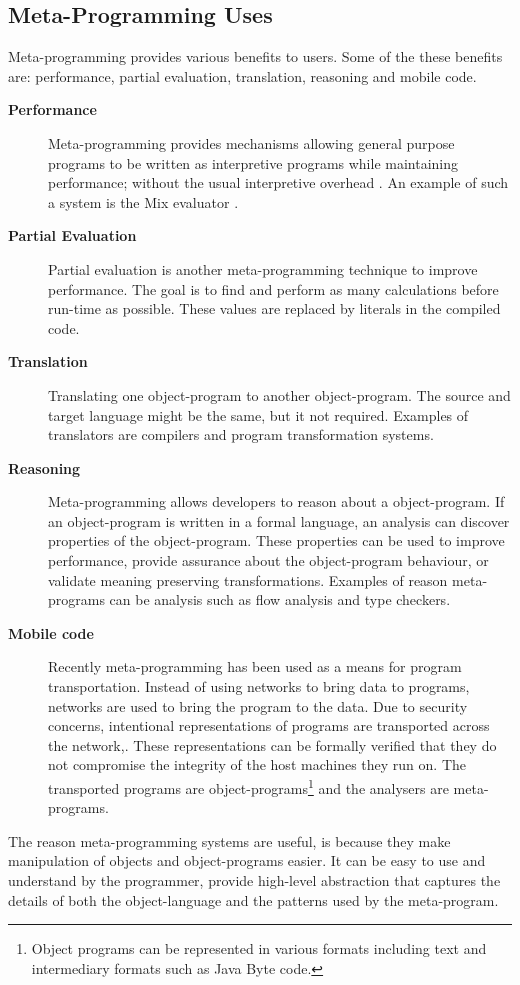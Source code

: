 \subsection{Meta-Programming Uses}
Meta-programming provides various benefits to users. Some of the these benefits are: performance, partial evaluation, translation, reasoning and mobile code.

\begin{description}
    \item[\textbf{Performance}]
    Meta-programming provides mechanisms allowing general purpose programs to be written as interpretive programs while maintaining performance; without the usual interpretive overhead \cite{sheard2001accomplishments}. An example of such a system is the Mix evaluator \cite{jones1989mix}.

    \item[\textbf{Partial Evaluation}] 
    Partial evaluation is another meta-programming technique to improve performance. The goal is to find and perform as many calculations before run-time as possible. These values are replaced by literals in the compiled code.

    \item[\textbf{Translation}]
    Translating one object-program to another object-program. The source and target language might be the same, but it not required. Examples of translators are compilers and program transformation systems\cite{sheard2001accomplishments}.

    \item[\textbf{Reasoning}]
    Meta-programming allows developers to reason about a object-program. If an object-program is written in a formal language, an analysis can discover properties of the object-program. These properties can be used to improve performance, provide assurance about the object-program behaviour, or validate meaning preserving transformations. Examples of reason meta-programs can be analysis such as flow analysis and type checkers.

    \item[\textbf{Mobile code}]
    Recently meta-programming has been used as a means for program transportation. Instead of using networks to bring data to programs, networks are used to bring the program to the data. Due to security concerns, intentional representations of programs are transported across the network\cite{Hornof:1999:CCR:609149.609203},\cite{Thibault:1998:SEA:829523.830979}. These representations can be formally verified that they do not compromise the integrity of the host machines they run on. The transported programs are object-programs\footnote{Object programs can be represented in various formats including text and intermediary formats such as Java Byte code.} and the analysers are meta-programs.
\end{description}

The reason meta-programming systems are useful, is because they make manipulation of objects and object-programs easier. It can be easy to use and understand by the programmer, provide high-level abstraction that captures the details of both the object-language and the patterns used by the meta-program\cite{sheard2001accomplishments}.




